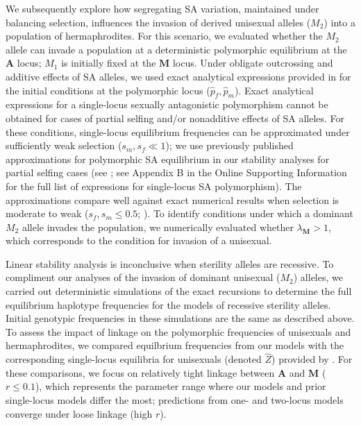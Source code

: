 \documentclass{article}
\begin{document}
We subsequently explore how segregating SA variation, maintained under balancing selection, influences the invasion of derived unisexual alleles ($M_2$) into a population of hermaphrodites. For this scenario, we evaluated whether the $M_2$ allele can invade a population at a deterministic polymorphic equilibrium at the $\mathbf{A}$ locus; $M_1$ is initially fixed at the $\mathbf{M}$ locus. Under obligate outcrossing and additive effects of SA alleles, we used exact analytical expressions provided in \citet{Kidwell1977} for the initial conditions at the polymorphic locus ($\hat{p}_f,\hat{p}_m$). Exact analytical expressions for a single-locus sexually antagonistic polymorphism cannot be obtained for cases of partial selfing and/or nonadditive effects of SA alleles. For these conditions, single-locus equilibrium frequencies can be approximated under sufficiently weak selection ($s_m,s_f \ll 1$); we use previously published approximations for polymorphic SA equilibrium in our stability analyses for partial selfing cases (see \citealt{JordanConnallon2014,ConnallonJordan2016}; see Appendix B in the Online Supporting Information  for the full list of expressions for single-locus SA polymorphism). The approximations compare well against exact numerical results when selection is moderate to weak ($s_f,s_m \leq 0.5$; \citealt{JordanConnallon2014, ConnallonJordan2016, Olito2016}). To identify conditions under which a dominant $M_2$ allele invades the population, we numerically evaluated whether $\lambda_{\mathbf{M}} > 1$, which corresponds to the condition for invasion of a unisexual.

Linear stability analysis is inconclusive when sterility alleles are recessive. To compliment our analyses of the invasion of dominant unisexual ($M_2$) alleles, we carried out deterministic simulations of the exact recursions to determine the full equilibrium haplotype frequencies for the models of recessive sterility alleles. Initial genotypic frequencies in these simulations are the same as described above. To assess the impact of linkage on the polymorphic frequencies of unisexuals and hermaphrodites, we compared equilbrium frequencies from our models with the corresponding single-locus equilibria for unisexuals (denoted $\hat{Z}$) provided by \citet{Charlesworth1978a}. For these comparisons, we focus on relatively tight linkage between $\mathbf{A}$ and $\mathbf{M}$ ($r\leq 0.1$), which represents the parameter range where our models and prior single-locus models differ the most; predictions from one- and two-locus models converge under loose linkage (high $r$). 
\end{document}
